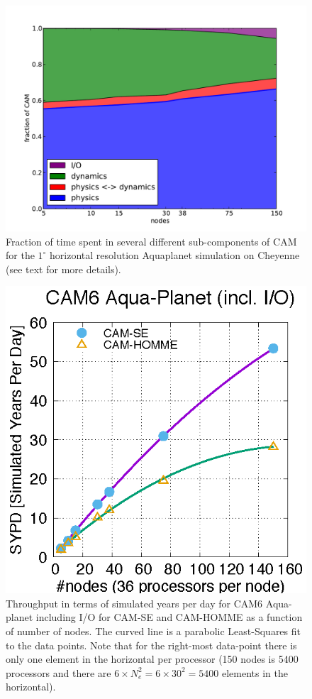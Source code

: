 \documentclass{agujournal}
\begin{document}
\begin{figure}[h]
\centering
 \includegraphics[scale=0.5]{figs/percent}
 \caption{Fraction of time spent in several different sub-components of CAM for the $1^\circ$ horizontal resolution Aquaplanet simulation on Cheyenne (see text for more details).}
 \label{fig:percent}
\end{figure}
\begin{figure}[h]
\centering
 \includegraphics[scale=1.0]{figs/SYPD}
 \caption{Throughput in terms of simulated years per day for CAM6 Aqua-planet including I/O for CAM-SE and CAM-HOMME as a function of number of nodes. The curved line is a parabolic Least-Squares fit to the data points. Note that for the right-most data-point there is only one element in the horizontal per processor (150 nodes is 5400 processors and there are $6\times N_e^2=6\times 30^2=5400$ elements in the horizontal).}
 \label{fig:SYPD}
\end{figure}
\end{document}
